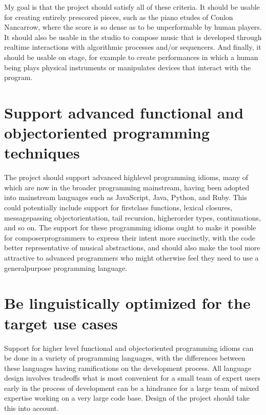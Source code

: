 \documentclass[letterpaper,10pt,english]{sphinxmanual}
\begin{document}
\sphinxAtStartPar
My goal is that the project should satisfy all of these criteria.
It should be usable for creating entirely pre\sphinxhyphen{}scored pieces, such as the piano etudes of Conlon Nancarrow,
where the score is so dense as to be unperformable by human players.
It should also be usable in the studio to compose music that is developed through realtime interactions with
algorithmic processes and/or sequencers.
And finally, it should be usable on stage, for example to create performances in which a human being plays
physical instruments or manipulates devices that interact with the program.


\section{Support advanced functional and object\sphinxhyphen{}oriented programming techniques}
\label{\detokenize{goals:support-advanced-functional-and-object-oriented-programming-techniques}}
\sphinxAtStartPar
The project should support advanced high\sphinxhyphen{}level programming idioms, many of which are now in the broader
programming mainstream, having been adopted into mainstream languages such as JavaScript, Java, Python, and Ruby.
This could potentially include support for first\sphinxhyphen{}class functions, lexical closures,
message\sphinxhyphen{}passing object\sphinxhyphen{}orientation, tail recursion, higher\sphinxhyphen{}order types, continuations, and so on.
The support for these programming idioms ought to make it possible for composer\sphinxhyphen{}programmers to express
their intent more succinctly, with the code better representative of musical abstractions, and should
also make the tool more attractive to advanced programmers who might otherwise
feel they need to use a general\sphinxhyphen{}purpose programming language.


\section{Be linguistically optimized for the target use cases}
\label{\detokenize{goals:be-linguistically-optimized-for-the-target-use-cases}}
\sphinxAtStartPar
Support for higher level functional and object\sphinxhyphen{}oriented programming idioms can be done in a variety of
programming languages, with the differences between these languages having ramifications on the development process.
All language design involves trade\sphinxhyphen{}offs \sphinxhyphen{} what is most convenient for a small team of expert users early
in the process of development can be a hindrance for a large team of mixed expertise working on a very large code base.
Design of the project should take this into account.
\end{document}
